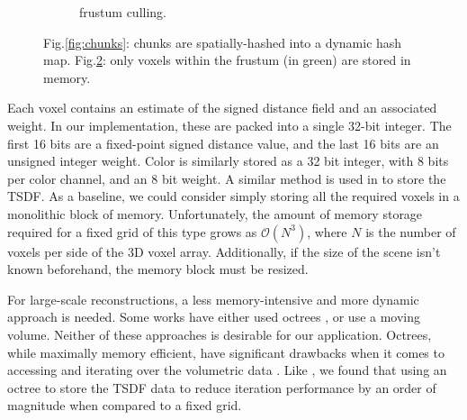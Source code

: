 \documentclass[conference]{IEEEtran}
\newcommand{\figref}[1]{Fig.\ref{#1}}
\newcommand{\TSDF}{TSDF\xspace}
\begin{document}
\begin{figure}[t!]
\begin{subfigure}{0.475\columnwidth}
	      \caption{frustum culling.}
	 	 \label{fig:frustum_cull}
	  \end{subfigure}
	  \caption{\figref{fig:chunks}: chunks are spatially-hashed \cite{SpatialHashing} into a
      dynamic hash map. 
      \figref{fig:frustum_cull}: only voxels within the frustum (in green) are stored in memory.}
\end{figure} 

Each voxel contains an estimate of the signed distance field and an
associated weight. In our implementation, these are packed into a single 32-bit
integer. The first 16 bits are a fixed-point signed distance value, and the
last 16 bits  are an unsigned integer weight. Color is similarly
stored as a 32 bit integer, with 8 bits per color channel, and an 8 bit weight.
A similar method is used in \cite{Newcombe, Whelan2013, Bylow2013, NiessnerHashing} to store
the \TSDF. As a baseline, we could consider simply storing all the required
voxels in a monolithic block of memory. Unfortunately, the amount of memory storage required
for a fixed grid of this type grows as $\mathcal{O}(N^3)$, where $N$ is the
number of voxels per side of the 3D voxel array. Additionally, if the size of
the scene isn't known beforehand, the memory block must be resized.


For large-scale reconstructions, a less memory-intensive and more dynamic
approach is needed. Some works have either used  octrees \cite{Wurm2010,
Zeng2012, Chen2012}, or use a moving volume\cite{Whelan2013}. Neither of these
approaches is desirable for our application. Octrees, while maximally memory
efficient, have significant drawbacks when it comes to accessing and iterating over the
volumetric data \cite{NiessnerHashing, CacheStructures}.  Like
\cite{NiessnerHashing}, we found that using an octree to store the \TSDF data
to reduce iteration performance by an order of magnitude when compared to a
fixed grid.
\end{document}
